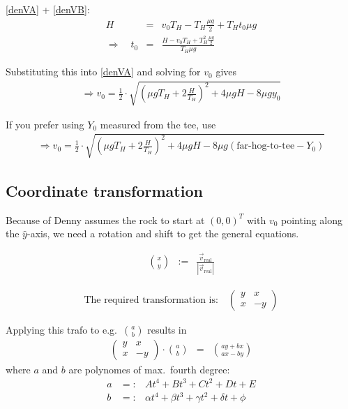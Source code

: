 \eqref{denVA} + \eqref{denVB}:
\begin{eqnarray}
H &=& v_0 T_H - T_H\frac{\mu g}{2} + T_H t_0 \mu g \\
\Longrightarrow\quad
t_0 &=& \frac{H - v_0 T_H + T_H^2\frac{\mu g}{2}}{ T_H \mu g }
\end{eqnarray}

Substituting this into \eqref{denVA} and solving for $v_0$ gives
\begin{eqnarray}
\Longrightarrow v_0 =  \frac{1}{2}\cdot 
    \sqrt{
	\left(\mu g T_H + 2\frac{H}{T_H}\right)^2 +
	4 \mu g H - 
	8 \mu g y_0
    }
\end{eqnarray}

If you prefer using $Y_0$ measured from the tee, use
\begin{eqnarray}
\Longrightarrow v_0 =  \frac{1}{2}\cdot 
    \sqrt{
	\left(\mu g T_H + 2\frac{H}{T_H}\right)^2 + 
	4 \mu g H - 
	8 \mu g (\mbox{far-hog-to-tee} - Y_0)
    }
\end{eqnarray}

\subsection{Coordinate transformation}

Because of Denny assumes the rock to start at
$(0,0)^T$ with $v_0$ pointing along the $\hat{y}$-axis, we need a
rotation and shift to get the general equations.

\begin{eqnarray}
{x \choose y} &:=& \frac{ \vec{v}_\mathrm{real} }{ | \vec{v}_\mathrm{real} | }
\end{eqnarray}

\begin{eqnarray}
\mbox{The required transformation is:}\quad
\left(\begin{array}{cc}
 y &  x \\
 x & -y
\end{array}\right)
\end{eqnarray}

Applying this trafo to e.g.\ ${a \choose b}$ results in
\begin{eqnarray}
\left(\begin{array}{cc}
 y &  x \\
 x & -y
\end{array}\right)
\cdot {a \choose b} &=&
{ay+bx \choose ax-by}
\end{eqnarray}
%
where $a$ and $b$ are polynomes of max.\ fourth degree:
%
\begin{eqnarray}
a &=:& At^4 + Bt^3 + Ct^2 + Dt + E \\
b &=:& \alpha t^4 + \beta t^3 + \gamma t^2 + \delta t + \phi
\end{eqnarray}

